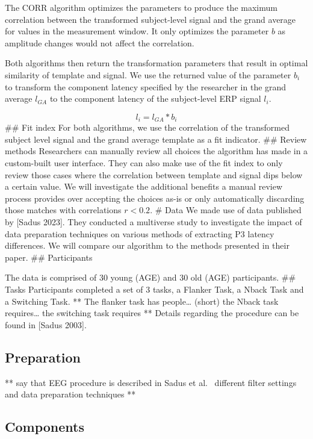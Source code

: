 \documentclass[
  man,floatsintext]{apa7}
\begin{document}
The CORR algorithm optimizes the parameters to produce the maximum correlation between the transformed subject-level signal and the grand average for values in the measurement window. It only optimizes the parameter \(b\) as amplitude changes would not affect the correlation.

Both algorithms then return the transformation parameters that result in optimal similarity of template and signal. We use the returned value of the parameter \(b_i\)
to transform the component latency specified by the researcher in the grand average \(l_{GA}\) to the component latency of the subject-level ERP signal \(l_i\).

\[ l_i = l_{GA} * b_i \]
\#\# Fit index
For both algorithms, we use the correlation of the transformed subject level signal and the grand average template as a fit indicator.
\#\# Review methods
Researchers can manually review all choices the algorithm has made in a custom-built user interface. They can also make use of the fit index to only review those cases where the correlation between template and signal dips below a certain value. We will investigate the additional benefits a manual review process provides over accepting the choices as-is or only automatically discarding those matches with correlations \(r < 0.2\).
\# Data
We made use of data published by {[}Sadus 2023{]}. They conducted a multiverse study to investigate the impact of data preparation techniques on various methods of extracting P3 latency differences. We will compare our algorithm to the methods presented in their paper.
\#\# Participants

The data is comprised of 30 young (AGE) and 30 old (AGE) participants.
\#\# Tasks
Participants completed a set of 3 tasks, a Flanker Task, a Nback Task and a Switching Task.
** The flanker task has people\ldots{} (short) \textbf{
} the Nback task requires\ldots{} \textbf{
} the switching task requires **
Details regarding the procedure can be found in {[}Sadus 2003{]}.

\hypertarget{preparation}{%
\subsection{Preparation}\label{preparation}}

** say that EEG procedure is described in Sadus et al.~\textbf{
} different filter settings and data preparation techniques **

\hypertarget{components}{%
\subsection{Components}\label{components}}
\end{document}
